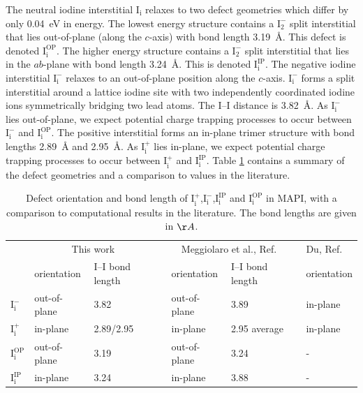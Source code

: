 The neutral iodine interstitial $\mathrm{I}_\mathrm{i}$ relaxes to two defect geometries which differ by only \SI{0.04}{\electronvolt} in energy. The lowest energy structure contains a $\mathrm{I}_2^-$ split interstitial that lies out-of-plane (along the $c$-axis) with bond length \SI{3.19}{\angstrom}. This defect is denoted $\mathrm{I}_\mathrm{i}^{\textrm{OP}}$. The higher energy structure contains a $\mathrm{I}_2^-$ split interstitial that lies in the $ab$-plane with bond length \SI{3.24}{\angstrom}. This is denoted $\mathrm{I}_\mathrm{i}^{\textrm{IP}}$. The negative iodine interstitial 
$\mathrm{I}_\mathrm{i}^-$ relaxes to an out-of-plane position along the $c$-axis. $\mathrm{I}_\mathrm{i}^-$ forms a split interstitial around a lattice iodine site with two independently coordinated iodine ions symmetrically bridging two lead atoms. The I--I distance is \SI{3.82}{\angstrom}. As $\mathrm{I}_\mathrm{i}^-$ lies out-of-plane, we expect potential charge trapping processes to occur between $\mathrm{I}_\mathrm{i}^-$ and $\mathrm{I}_\mathrm{i}^{\textrm{OP}}$. The positive interstitial forms an in-plane trimer structure with bond lengths \SI{2.89}{\angstrom} and \SI{2.95}{\angstrom}. As $\mathrm{I}_\mathrm{i}^+$ lies in-plane, we expect potential charge trapping processes to occur between $\mathrm{I}_\mathrm{i}^+$ and $\mathrm{I}_\mathrm{i}^{\textrm{IP}}$.
Table \ref{compare_geoms} contains a summary of the defect geometries and a comparison to values in the literature.

\begin{table}[h!]\centering
\begin{tabular}{llllllll}\toprule
\phantom{abcd}&\multicolumn{2}{c}{This work} &\phantom{a} &\multicolumn{2}{c}{Meggiolaro et al., Ref. \cite{Meggiolaro2018}}&\phantom{a} & Du, Ref. \cite{Du2015} \\
\cline{2-3} \cline{5-6} \cline{8-8}
& orientation & I--I bond length && orientation & I--I bond length  && orientation \\  
\midrule
$\mathrm{I}_\mathrm{i}^-$ &  out-of-plane & 3.82  &&  out-of-plane & 3.89 && in-plane \\
$\mathrm{I}_\mathrm{i}^+$ & in-plane & 2.89/2.95 && in-plane & 2.95 average && in-plane \\
$\mathrm{I}_\mathrm{i}^\mathrm{OP}$ & out-of-plane & 3.19 && out-of-plane & 3.24 && - \\
$\mathrm{I}_\mathrm{i}^\mathrm{IP}$ & in-plane & 3.24 && in-plane & 3.88 && - \\
\end{tabular} 
\caption[Defect orientation and bond length of $\mathrm{I}_\mathrm{i}^+$, $\mathrm{I}_\mathrm{i}^-$ and $\mathrm{I}_\mathrm{i}^0$]{\label{compare_geoms}Defect orientation and bond length of $\mathrm{I}_\mathrm{i}^+$,$\mathrm{I}_\mathrm{i}^-$,$\mathrm{I}_\mathrm{i}^\mathrm{IP}$ and $\mathrm{I}_\mathrm{i}^\mathrm{OP}$ in MAPI, with a comparison to computational results in the literature. The bond lengths are given in $\AA$.}
\end{table}

